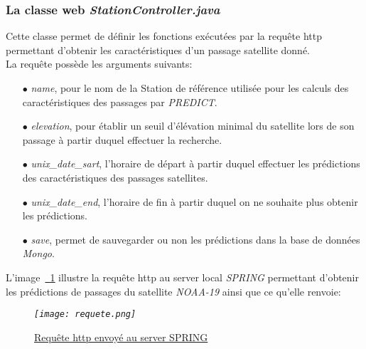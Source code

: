 \documentclass[12pt,fleqn]{book} %
\begin{document}
\subsubsection{La classe web \emph{StationController.java}}
\noindent Cette classe permet de définir les fonctions exécutées par la requête http permettant d'obtenir les caractéristiques d'un passage satellite donné.
~\\La requête possède les arguments suivants:
\begin{itemize}
 \item[$\bullet$] \emph{name}, pour le nom de la Station de référence utilisée pour les calculs des caractéristiques des passages par \emph{PREDICT}.
 \item[$\bullet$] \emph{elevation}, pour établir un seuil d'élévation minimal du satellite lors de son passage à partir duquel effectuer la recherche.
 \item[$\bullet$] \emph{unix\_date\_sart}, l'horaire de départ à partir duquel effectuer les prédictions des caractéristiques des passages satellites.
 \item[$\bullet$] \emph{unix\_date\_end}, l'horaire de fin à partir duquel on ne souhaite plus obtenir les prédictions.
 \item[$\bullet$] \emph{save}, permet de sauvegarder ou non les prédictions dans la base de données \emph{Mongo}.
\end{itemize}
L'image~\underline{\color{blue}~\ref{requete}} illustre la requête http au server local \emph{SPRING} permettant d'obtenir les prédictions de passages du satellite \emph{NOAA-19} ainsi que ce qu'elle renvoie:
\begin{figure}[H]
	\centering
	\itshape
	\texttt{[image: requete.png]}
	\caption{\label{requete} \underline{Requête http envoyé au server SPRING}}
\end{figure}
\end{document}
